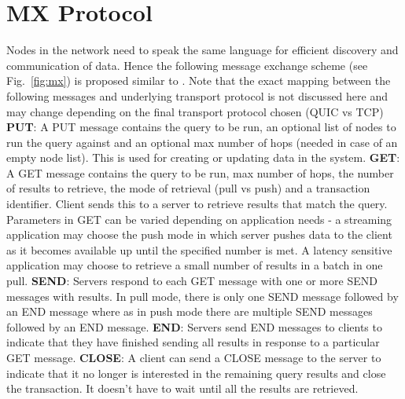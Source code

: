 \documentclass[preprint,10pt]{elsarticle}
\newcommand{\figref}[1]{Fig.~\ref{#1}}
\theoremstyle{definition}
\begin{document}
\section{MX Protocol} \label{sec:mx_protocol}
Nodes in the network need to speak the same language for efficient discovery and communication of data. Hence the following message exchange scheme (see \figref{fig:mx}) is proposed similar to \cite{Protocol_Spec}. Note that the exact mapping between the following messages and underlying transport protocol is not discussed here and may change depending on the final transport protocol chosen (\textsf{QUIC} vs \textsf{TCP})
\newline
\newline
\textbf{PUT}:  A \textsf{PUT} message contains the query to be run, an optional list of nodes to run the query against and an optional max number of hops (needed in case of an empty node list). This is used for creating or updating data in the system.
\newline
\newline
\textbf{GET}: A \textsf{GET} message contains the query to be run, max number of hops, the number of results to retrieve, the mode of retrieval (pull vs push) and a transaction identifier. Client sends this to a server to retrieve results that match the query. Parameters in \textsf{GET} can be varied depending on application needs - a streaming application may choose the push mode in which server pushes data to the client as it becomes available up until the specified number is met. A latency sensitive application may choose to retrieve a small number of results in a batch in one pull.
\newline
\newline
\textbf{SEND}: Servers respond to each \textsf{GET} message with one or more \textsf{SEND} messages with results. In pull mode, there is only one \textsf{SEND} message followed by an \textsf{END} message where as in push mode there are multiple \textsf{SEND} messages followed by an \textsf{END} message.
\newline
\newline
\textbf{END}: Servers send \textsf{END} messages to clients to indicate that they have finished sending all results in response to a particular \textsf{GET} message.
\newline
\newline
\textbf{CLOSE}: A client can send a \textsf{CLOSE} message to the server to indicate that it no longer is interested in the remaining query results and close the transaction. It doesn't have to wait until all the results are retrieved.
\end{document}
